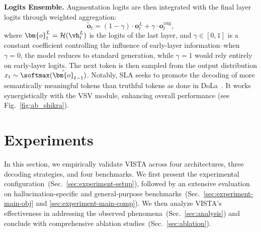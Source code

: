\documentclass{article}
\newcommand{\ours}{{VISTA}\xspace}
\theoremstyle{plain}
\theoremstyle{definition}
\theoremstyle{remark}
\begin{document}
\textbf{Logits Ensemble.} 
Augmentation logits are then integrated with the final layer logits through weighted aggregation:
\begin{equation} 
\tilde{\bm{o}}_t = (1-\gamma) \cdot \bm{o}_t^L + \gamma \cdot \bm{o}_t^{\text{aug}},
\end{equation}
where $\bm{o}_t^L = \mathcal{H}(\vh_t^L)$ is the logits of the last layer, and $\gamma \in [0, 1]$ is a constant coefficient controlling the influence of early-layer information--when $\gamma = 0$, the model reduces to standard generation, while $\gamma = 1$ would rely entirely on early-layer logits. The next token is then sampled from the output distribution $x_{t} \sim \softmax(\tilde{\bm{o}}_{t-1})$. Notably, SLA seeks to promote the decoding of more semantically meaningful tokens than truthful tokens as done in DoLa~\cite{dola}. It works synergistically with the VSV module, enhancing overall performance (see Fig.~\ref{fig:ab_shikra}).

\section{Experiments}\label{sec:experiment}
In this section, we empirically validate \ours across four architectures, three decoding strategies, and four benchmarks. We first present the experimental configuration~(Sec.~\ref{sec:experiment-setup}), followed by an extensive evaluation on hallucination-specific and general-purpose benchmarks~(Sec.~\ref{sec:experiment-main-obj} and \ref{sec:experiment-main-comp}). We then analyze VISTA's effectiveness in addressing the observed phenomena~(Sec.~\ref{sec:analysis}) and conclude with comprehensive ablation studies~(Sec.~\ref{sec:ablation}).
\end{document}

